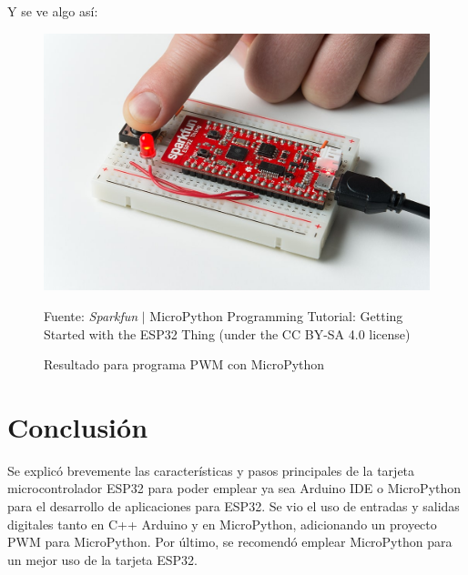 \documentclass[conference]{IEEEtran}
\begin{document}
Y se ve algo así:

\begin{figure}[H]
\centering
\includegraphics[width=0.3\paperwidth]{images/esp32-micropython-pwm-photo}
\caption{Resultado para programa PWM con MicroPython} \footnotesize
Fuente: \textit{Sparkfun} $\mid$ MicroPython Programming Tutorial: Getting Started with the ESP32 Thing \cite{hymel} (under the CC BY-SA 4.0 license)
\end{figure}

\section{Conclusión}\label{sec:conclusion}

Se explicó brevemente las características y pasos principales de la tarjeta microcontrolador ESP32 para poder emplear ya sea Arduino IDE o MicroPython para el desarrollo de aplicaciones para ESP32. Se vio el uso de entradas y salidas digitales tanto en C++ Arduino y en MicroPython, adicionando un proyecto PWM para MicroPython. Por último, se recomendó emplear MicroPython para un mejor uso de la tarjeta ESP32.

\printbibliography
\end{document}
